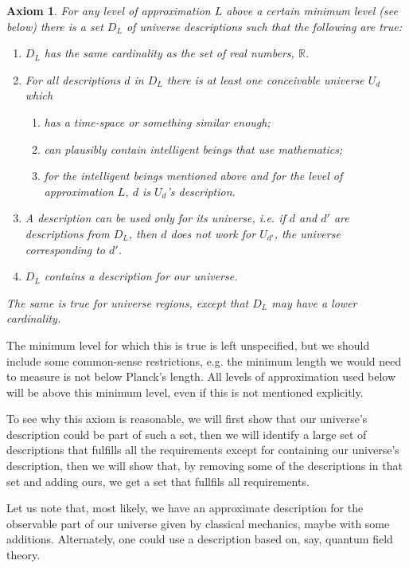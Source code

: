 \documentclass[a4paper
]{article}
\def\reale{\mathbb{R}}
\def\descriptions{D_L}
\newtheorem{axiom}{Axiom}
\begin{document}
\begin{axiom}\label{ax:uncountable}
  For any level of approximation $L$ above a certain minimum level (see below)
  there is a set $\descriptions$
  of universe descriptions such that the following are true:
  \begin{enumerate}
    \item $\descriptions$ has the same cardinality as
          the set of real numbers, $\reale$.
    \item For all descriptions $d$ in $\descriptions$
          there is at least one conceivable
          universe $U_d$ which
      \begin{enumerate}
        \item has a time-space or something similar enough;
        \item can plausibly contain intelligent beings that use mathematics;
        \item for the intelligent beings mentioned above and
              for the level of approximation $L$,
              $d$ is $U_d$'s description.
      \end{enumerate}
    \item A description can be used only for its universe, i.e.
          if $d$ and $d'$ are descriptions from $\descriptions$,
          then $d$ does not work
          for $U_{d'}$, the universe corresponding to $d'$.
    \item $\descriptions$ contains a description for our universe.
  \end{enumerate}
  The same is true for universe regions, except that
  $\descriptions$ may have a lower
  cardinality.
\end{axiom}

The minimum level for which this is true is left unspecified, but we should
include some common-sense restrictions, e.g. the minimum length we would
need to measure is not below Planck's length.
All levels of approximation used below will be above this
minimum level, even if this is not mentioned explicitly.

To see why this axiom is reasonable, we will first show that our universe's
description could be part of such a set, then we will identify a large set
of descriptions that fulfills all the requirements except for containing
our universe's description, then we will show that, by removing some of the
descriptions in that set and adding ours, we get a set that fullfils all
requirements.

Let us note that,
most likely, we have an approximate description for the observable part
of our universe
given by classical mechanics, maybe with some additions.
Alternately, one could use a description based on, say, quantum field theory.
\end{document}

